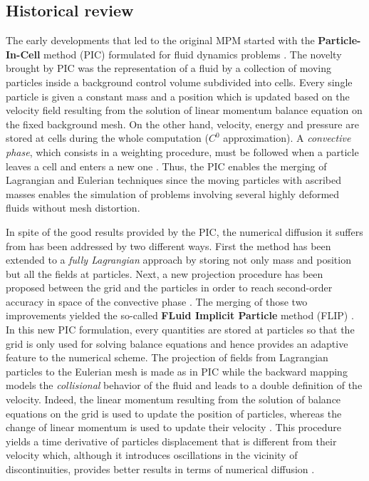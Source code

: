\subsection{Historical review}

The early developments that led to the original MPM started with the \textbf{Particle-In-Cell} method (PIC) formulated for fluid dynamics problems \cite{PIC}. The novelty brought by PIC was the representation of a fluid by a collection of moving particles inside a background control volume subdivided into cells. Every single particle is given a constant mass and a position which is updated based on the velocity field resulting from the solution of linear momentum balance equation on the fixed background mesh. On the other hand, velocity, energy and pressure are stored at cells during the whole computation ($C^0$ approximation). A \textit{convective phase}, which consists in a weighting procedure, must be followed when a particle leaves a cell and enters a new one \cite{PIC}. Thus, the PIC enables the merging of Lagrangian and Eulerian techniques since the moving particles with ascribed masses enables the simulation of problems involving several highly deformed fluids without mesh distortion.

In spite of the good results provided by the PIC, the numerical diffusion it suffers from has been addressed by two different ways. First the method has been extended to a \textit{fully Lagrangian} approach \cite{McCrory_FLIP} by storing not only mass and position but all the fields at particles. Next, a new projection procedure has been proposed between the grid and the particles in order to reach second-order accuracy in space of the convective phase \cite{PIC_Nishiguchi}. The merging of those two improvements yielded the so-called \textbf{FLuid Implicit Particle} method (FLIP) \cite{FLIP}. In this new PIC formulation, every quantities are stored at particles so that the grid is only used for solving balance equations and hence provides an adaptive feature to the numerical scheme. The projection of fields from Lagrangian particles to the Eulerian mesh is made as in PIC while the backward mapping models the \textit{collisional} behavior of the fluid and leads to a double definition of the velocity. Indeed, the linear momentum resulting from the solution of balance equations on the grid is used to update the position of particles, whereas the change of linear momentum is used to update their velocity \cite{Mass_Flip}. This procedure yields a time derivative of particles displacement that is different from their velocity which, although it introduces oscillations in the vicinity of discontinuities, provides better results in terms of numerical diffusion \cite{Mass_Flip}.






